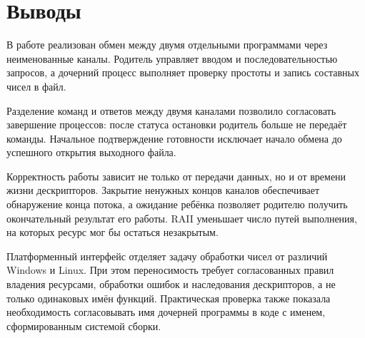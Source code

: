 \section{Выводы}
В работе реализован обмен между двумя отдельными программами через неименованные каналы. Родитель управляет вводом и последовательностью запросов, а дочерний процесс выполняет проверку простоты и запись составных чисел в файл.

Разделение команд и ответов между двумя каналами позволило согласовать завершение процессов: после статуса остановки родитель больше не передаёт команды. Начальное подтверждение готовности исключает начало обмена до успешного открытия выходного файла.

Корректность работы зависит не только от передачи данных, но и от времени жизни дескрипторов. Закрытие ненужных концов каналов обеспечивает обнаружение конца потока, а ожидание ребёнка позволяет родителю получить окончательный результат его работы. RAII уменьшает число путей выполнения, на которых ресурс мог бы остаться незакрытым.

Платформенный интерфейс отделяет задачу обработки чисел от различий Windows и Linux. При этом переносимость требует согласованных правил владения ресурсами, обработки ошибок и наследования дескрипторов, а не только одинаковых имён функций. Практическая проверка также показала необходимость согласовывать имя дочерней программы в коде с именем, сформированным системой сборки.
